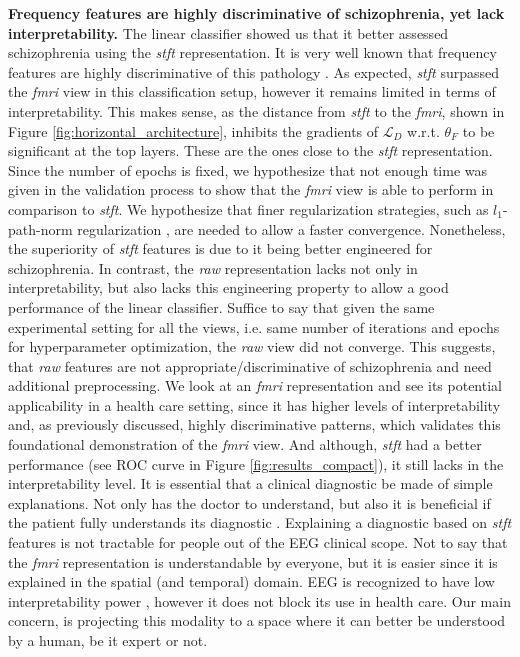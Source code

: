 \documentclass{article}
\begin{document}
\noindent\textbf{Frequency features are highly discriminative of schizophrenia, yet lack interpretability.} The linear classifier showed us that it better assessed schizophrenia using the \textit{stft} representation. It is very well known that frequency features are highly discriminative of this pathology \cite{itil1977qualitative, roach2008event}. As expected, \textit{stft} surpassed the \textit{fmri} view in this classification setup, however it remains limited in terms of interpretability. This makes sense, as the distance from \textit{stft} to the \textit{fmri}, shown in Figure \ref{fig:horizontal_architecture}, inhibits the gradients of $\mathcal{L}_D$ w.r.t. $\theta_F$ to be significant at the top layers. These are the ones close to the \textit{stft} representation. Since the number of epochs is fixed, we hypothesize that not enough time was given in the validation process to show that the \textit{fmri} view is able to perform in comparison to \textit{stft}. We hypothesize that finer regularization strategies, such as $l_1$-path-norm regularization \cite{neyshabur2015path}, are needed to allow a faster convergence. Nonetheless, the superiority of \textit{stft} features is due to it being better engineered for schizophrenia. In contrast, the \textit{raw} representation lacks not only in interpretability, but also lacks this engineering property to allow a good performance of the linear classifier. Suffice to say that given the same experimental setting for all the views, i.e. same number of iterations and epochs for hyperparameter optimization, the \textit{raw} view did not converge. This suggests, that \textit{raw} features are not appropriate/discriminative of schizophrenia and need additional preprocessing. We look at an \textit{fmri} representation and see its potential applicability in a health care setting, since it has higher levels of interpretability and, as previously discussed, highly discriminative patterns, which validates this foundational demonstration of the \textit{fmri} view. And although, \textit{stft} had a better performance (see ROC curve in Figure \ref{fig:results_compact}), it still lacks in the interpretability level. It is essential that a clinical diagnostic be made of simple explanations. Not only has the doctor to understand, but also it is beneficial if the patient fully understands its diagnostic \cite{yadav2019patients}. Explaining a diagnostic based on \textit{stft} features is not tractable for people out of the EEG clinical scope. Not to say that the \textit{fmri} representation is understandable by everyone, but it is easier since it is explained in the spatial (and temporal) domain. EEG is recognized to have low interpretability power \cite{de2019introduction}, however it does not block its use in health care. Our main concern, is projecting this modality to a space where it can better be understood by a human, be it expert or not.\vskip 0.15cm
\end{document}
